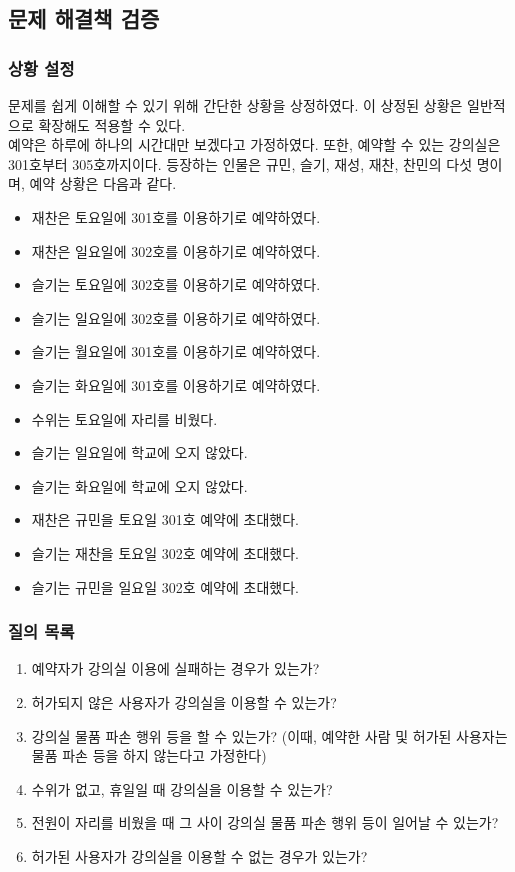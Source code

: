 \documentclass[11pt,a4paper]{article}
\begin{document}
\subsection{문제 해결책 검증}

\subsubsection{상황 설정}
문제를 쉽게 이해할 수 있기 위해 간단한 상황을 상정하였다. 이 상정된 상황은 일반적으로 확장해도 적용할 수 있다.\\
예약은 하루에 하나의 시간대만 보겠다고 가정하였다. 또한, 예약할 수 있는 강의실은 301호부터 305호까지이다. 등장하는 인물은 규민, 슬기, 재성, 재찬, 찬민의 다섯 명이며, 예약 상황은 다음과 같다.
\begin{itemize} 
\item 재찬은 토요일에 301호를 이용하기로 예약하였다.
\item 재찬은 일요일에 302호를 이용하기로 예약하였다.
\item 슬기는 토요일에 302호를 이용하기로 예약하였다.
\item 슬기는 일요일에 302호를 이용하기로 예약하였다.
\item 슬기는 월요일에 301호를 이용하기로 예약하였다.
\item 슬기는 화요일에 301호를 이용하기로 예약하였다.
\item 수위는 토요일에 자리를 비웠다.
\item 슬기는 일요일에 학교에 오지 않았다.
\item 슬기는 화요일에 학교에 오지 않았다.
\item 재찬은 규민을 토요일 301호 예약에 초대했다.
\item 슬기는 재찬을 토요일 302호 예약에 초대했다.
\item 슬기는 규민을 일요일 302호 예약에 초대했다.
\end{itemize}

\subsubsection{질의 목록}
\begin{enumerate}
\item 예약자가 강의실 이용에 실패하는 경우가 있는가?
\item 허가되지 않은 사용자가 강의실을 이용할 수 있는가?
\item 강의실 물품 파손 행위 등을 할 수 있는가? (이때, 예약한 사람 및 허가된 사용자는 물품 파손 등을 하지 않는다고 가정한다)
\item 수위가 없고, 휴일일 때 강의실을 이용할 수 있는가?
\item 전원이 자리를 비웠을 때 그 사이 강의실 물품 파손 행위 등이 일어날 수 있는가?
\item 허가된 사용자가 강의실을 이용할 수 없는 경우가 있는가?
\end{enumerate}
\end{document}
